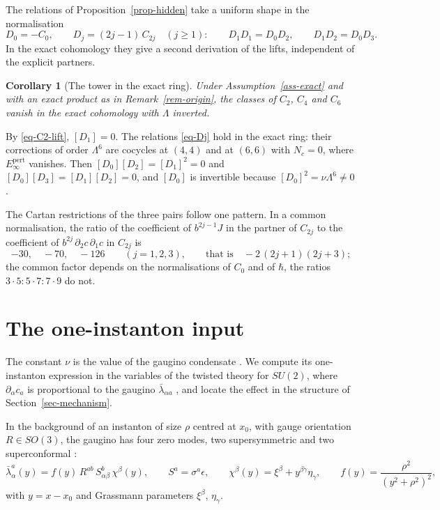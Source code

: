 \documentclass[11pt]{article}
\numberwithin{equation}{section}
\numberwithin{figure}{section}
\numberwithin{table}{section}
\newtheorem{corollary}[theorem]{Corollary}
\theoremstyle{definition}
\newcommand{\Ep}{E_\infty^{\mathrm{pert}}}
\begin{document}
The relations of Proposition~\ref{prop-hidden} take a uniform shape in the normalisation
\begin{equation}\label{eq-Dj}
D_0=-C_0,\qquad D_j=(2j-1)\,C_{2j}\quad(j\ge1):\qquad D_1D_1=D_0D_2,\qquad D_1D_2=D_0D_3 .
\end{equation}
In the exact cohomology they give a second derivation of the lifts, independent of the explicit partners.

\begin{corollary}[The tower in the exact ring]\label{cor-ring}
Under Assumption~\ref{ass-exact} and with an exact product as in Remark~\ref{rem-origin}, the classes of $C_2$, $C_4$ and $C_6$ vanish in the exact cohomology with $\Lambda$ inverted.
\end{corollary}

\begin{proofbox}
By \eqref{eq-C2-lift}, $[D_1]=0$. The relations \eqref{eq-Dj} hold in the exact ring: their corrections of order $\Lambda^6$ are cocycles at $(4,4)$ and at $(6,6)$ with $N_c=0$, where $\Ep$ vanishes. Then $[D_0][D_2]=[D_1]^2=0$ and $[D_0][D_3]=[D_1][D_2]=0$, and $[D_0]$ is invertible because $[D_0]^2=\nu\Lambda^6\neq0$.
\end{proofbox}

The Cartan restrictions of the three pairs follow one pattern. In a common normalisation, the ratio of the coefficient of $b^{2j-1}J$ in the partner of $C_{2j}$ to the coefficient of $b^{2j}\,\partial_2c\,\partial_1c$ in $C_{2j}$ is
\begin{equation}\label{eq-ratios}
-30,\quad -70,\quad -126\qquad(j=1,2,3),\qquad\text{that is}\quad -2\,(2j+1)(2j+3);
\end{equation}
the common factor depends on the normalisations of $C_0$ and of $\hbar$, the ratios $3\cdot5:5\cdot7:7\cdot9$ do not.

\section{The one-instanton input}\label{sec-instanton}

The constant $\nu$ is the value of the gaugino condensate \cite{NSVZ,VY}. We compute its one-instanton expression in the variables of the twisted theory for $SU(2)$, where $\partial_\alpha c_a$ is proportional to the gaugino $\bar\lambda_{\alpha a}$ \cite[Equation~(3.2)]{LLCh}, and locate the effect in the structure of Section~\ref{sec-mechanism}.

In the background of an instanton of size $\rho$ centred at $x_0$, with gauge orientation $R\in SO(3)$, the gaugino has four zero modes, two supersymmetric and two superconformal \cite{NSVZ,DHKMreview}:
\begin{equation}\label{eq-zm}
\bar\lambda^a_\alpha(y)=f(y)\,R^{ab}\,S^b_{\alpha\beta}\,\chi^\beta(y),\qquad
S^a=\sigma^a\epsilon,\qquad \chi^\beta(y)=\xi^\beta+y^{\beta\dot\gamma}\eta_{\dot\gamma},\qquad f(y)=\frac{\rho^2}{(y^2+\rho^2)^2},
\end{equation}
with $y=x-x_0$ and Grassmann parameters $\xi^\beta$, $\eta_{\dot\gamma}$.
\end{document}
